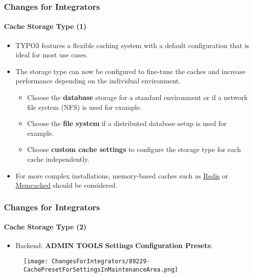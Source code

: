 \begin{frame}[fragile]
	\frametitle{Changes for Integrators}
	\framesubtitle{Cache Storage Type (1)}

	\begin{itemize}

		\item TYPO3 features a flexible caching system with a default configuration
			that is ideal for most use cases.
		\item The storage type can now be configured to fine-tune the caches and
			increase performance depending on the individual environment.

			\begin{itemize}
				\item Choose the \textbf{database} storage for a standard environment
					or if a network file system (NFS) is used for example.
				\item Choose the \textbf{file system} if a distributed database setup
					is used for example.
				\item Choose \textbf{custom cache settings} to configure the storage
					type for each cache independently.
			\end{itemize}

		\item For more complex installations, memory-based caches such as
			\href{https://redis.io/}{Redis}
			or
			\href{https://memcached.org/}{Memcached}
			should be considered.

	\end{itemize}

\end{frame}


%

\begin{frame}[fragile]
	\frametitle{Changes for Integrators}
	\framesubtitle{Cache Storage Type (2)}

	\begin{itemize}

		\item Backend: \textbf{ADMIN TOOLS} \hspace{0.1cm}\textbf{Settings} \hspace{0.1cm}\textbf{Configuration Presets}:
		\end{itemize}

	\begin{figure}
		\texttt{[image: ChangesForIntegrators/89229-CachePresetForSettingsInMaintenanceArea.png]}
	\end{figure}

\end{frame}

